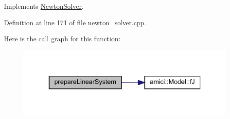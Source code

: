 Implements \mbox{\hyperlink{classamici_1_1_newton_solver_a4aed46b0343374f171f9b4b51fa009e7}{Newton\+Solver}}.



Definition at line 171 of file newton\+\_\+solver.\+cpp.

Here is the call graph for this function\+:
\nopagebreak
\begin{figure}[H]
\begin{center}
\leavevmode
\includegraphics[width=313pt]{classamici_1_1_newton_solver_dense_a0b900656d018299b08d0f027e95bd347_cgraph}
\end{center}
\end{figure}
